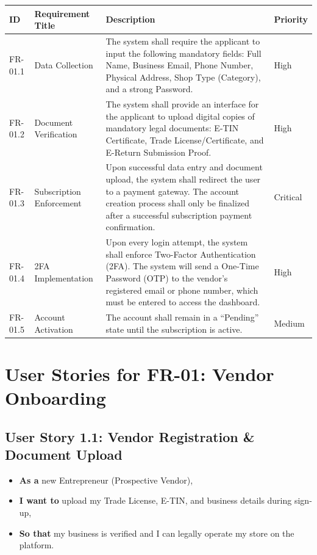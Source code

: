 \begin{table}[H]
\centering
\label{tab:vendor-requirements}
\begin{tabular}{>{\raggedright\arraybackslash}p{2cm}>{\raggedright\arraybackslash}p{3cm}>{\raggedright\arraybackslash}p{7cm}>{\centering\arraybackslash}p{2cm}}
\toprule
\textbf{ID} & \textbf{Requirement Title} & \textbf{Description} & \textbf{Priority} \\
\midrule
FR-01.1 & Data Collection & The system shall require the applicant to input the following mandatory fields: Full Name, Business Email, Phone Number, Physical Address, Shop Type (Category), and a strong Password. & High \\
\midrule
FR-01.2 & Document Verification & The system shall provide an interface for the applicant to upload digital copies of mandatory legal documents: E-TIN Certificate, Trade License/Certificate, and E-Return Submission Proof. & High \\
\midrule
FR-01.3 & Subscription Enforcement & Upon successful data entry and document upload, the system shall redirect the user to a payment gateway. The account creation process shall only be finalized after a successful subscription payment confirmation. & Critical \\
\midrule
FR-01.4 & 2FA Implementation & Upon every login attempt, the system shall enforce Two-Factor Authentication (2FA). The system will send a One-Time Password (OTP) to the vendor's registered email or phone number, which must be entered to access the dashboard. & High \\
\midrule
FR-01.5 & Account Activation & The account shall remain in a ``Pending'' state until the subscription is active. & Medium \\
\bottomrule
\end{tabular}
\end{table}

\section*{User Stories for FR-01: Vendor Onboarding}

\subsection*{User Story 1.1: Vendor Registration \& Document Upload}
\begin{itemize}
    \item \textbf{As a} new Entrepreneur (Prospective Vendor),
    \item \textbf{I want to} upload my Trade License, E-TIN, and business details during sign-up,
    \item \textbf{So that} my business is verified and I can legally operate my store on the platform.
\end{itemize}

